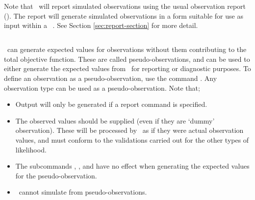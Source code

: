 Note that \SPM\ will report simulated observations using the usual observation report (). The report  will generate simulated observations in a form suitable for use as input within a \SPM\ \config. See Section \ref{sec:report-section} for more detail.

\subsection{}

\SPM\ can generate expected values for observations without them contributing to the total objective function. These are called pseudo-observations, and can be used to either generate the expected values from \SPM\ for reporting or diagnostic purposes. To define an observation as a pseudo-observation, use the command . Any observation type can be used as a pseudo-observation. Note that;

\begin{itemize}
  \item Output will only be generated if a report command  is specified.
  \item The observed values should be supplied (even if they are `dummy' observation). These will be processed by \SPM\ as if they were actual observation values, and must conform to the validations carried out for the other types of likelihood. 
  \item The subcommands , ,  and  have no effect when generating the expected values for the pseudo-observation.   
  \item \SPM\ cannot simulate from pseudo-observations.
\end{itemize}
